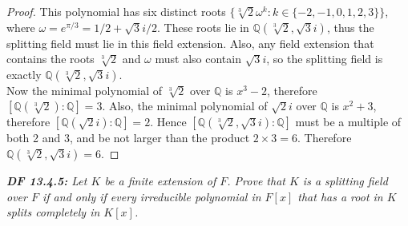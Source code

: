 \documentclass{article}
\begin{document}
  \begin{proof}
    This polynomial has six distinct roots $\{\sqrt[3]{2}\omega^k:
    k\in\{-2,-1,0,1,2,3\}\}$, where $\omega=e^{\pi/3}=1/2+\sqrt{3}i/2$.
    These roots lie in $\mathbb{Q}(\sqrt[3]{2},\sqrt{3}i)$, thus the
    splitting field must lie in this field extension. Also, any field
    extension that contains the roots $\sqrt[3]{2}$ and $\omega$
    must also contain $\sqrt{3}i$, so the splitting field is
    exactly $\mathbb{Q}(\sqrt[3]{2},\sqrt{3}i)$. \\

    Now the minimal polynomial of $\sqrt[3]{2}$ over $\mathbb{Q}$ is
    $x^3-2$, therefore $[\mathbb{Q}(\sqrt[3]{2}):\mathbb{Q}]=3$.  Also, the
    minimal polynomial of $\sqrt{2}i$ over $\mathbb{Q}$ is $x^2+3$,
    therefore $[\mathbb{Q}(\sqrt{2}i):\mathbb{Q}]=2$. Hence
    $[\mathbb{Q}(\sqrt[3]{2},\sqrt{3}i):\mathbb{Q}]$ must be a multiple of
    both 2 and 3, and be not larger than the product $2\times3=6$.
    Therefore $\mathbb{Q}(\sqrt[3]{2},\sqrt{3}i)=6$.
  \end{proof}

\it \textbf{DF 13.4.5:} Let $K$ be a finite extension of $F$. Prove that
  $K$ is a splitting field over $F$ if and only if every irreducible
  polynomial in $F[x]$ that has a root in $K$ splits completely in $K[x]$.
\end{document}
